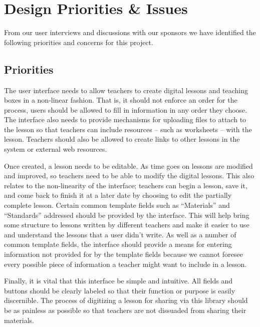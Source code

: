 \documentclass[10pt,letter,titlepage]{article}
\begin{document}
\section{Design Priorities \& Issues}
From our user interviews and discussions with our sponsors we have identified
the following priorities and concerns for this project.

\subsection{Priorities}
The user interface needs to allow teachers to create digital lessons and
teaching boxes in a non-linear fashion. That is, it should not enforce an order
for the process, users should be allowed to fill in information in any order
they choose. The interface also needs to provide mechanisms for uploading files
to attach to the lesson so that teachers can include resources -- such as
worksheets -- with the lesson. Teachers should also be allowed to create links
to other lessons in the system or external web resources.

Once created, a lesson needs to be editable. As time goes on lessons are
modified and improved, so teachers need to be able to modify the digital
lessons. This also relates to the non-linearity of the interface; teachers can
begin a lesson, save it, and come back to finish it at a later date by choosing
to edit the partially complete lesson. Certain common template fields such as
``Materials'' and ``Standards'' addressed should be provided by the interface.
This will help bring some structure to lessons written by different teachers and
make it easier to use and understand the lessons that a user didn't write. As
well as a number of common template fields, the interface should provide a means
for entering information not provided for by the template fields because we
cannot foresee every possible piece of information a teacher might want to
include in a lesson.

Finally, it is vital that this interface be simple and intuitive. All fields and
buttons should be clearly labeled so that their function or purpose is easily
discernible. The process of digitizing a lesson for sharing via this library
should be as painless as possible so that teachers are not dissuaded from
sharing their materials.
\end{document}
